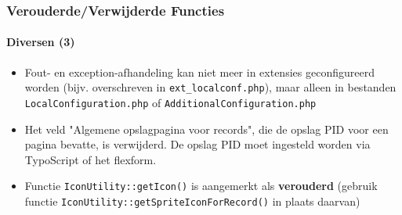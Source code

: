 \begin{frame}[fragile]
	\frametitle{Verouderde/Verwijderde Functies}
	\framesubtitle{Diversen (3)}

	\begin{itemize}

		\item Fout- en exception-afhandeling kan niet meer in extensies geconfigureerd worden (bijv. overschreven in
			\texttt{ext\_localconf.php}), maar alleen in bestanden \texttt{LocalConfiguration.php} of
			\texttt{AdditionalConfiguration.php}

		\item Het veld "Algemene opslagpagina voor records", die de opslag PID voor een pagina bevatte, is verwijderd.
			De opslag PID moet ingesteld worden via TypoScript of het flexform.

		\item Functie \texttt{IconUtility::getIcon()} is aangemerkt als \textbf{verouderd} (gebruik
			functie \texttt{IconUtility::getSpriteIconForRecord()} in plaats daarvan)

	\end{itemize}

\end{frame}

